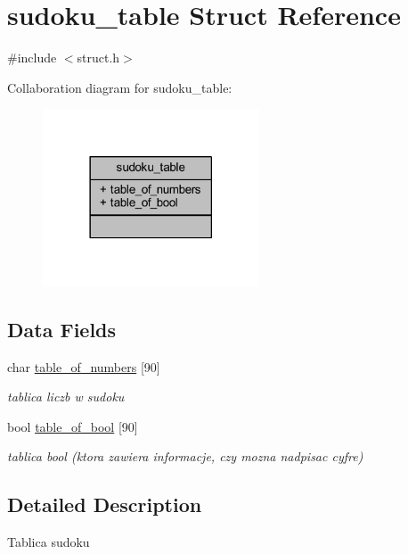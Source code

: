 \hypertarget{structsudoku__table}{}\section{sudoku\+\_\+table Struct Reference}
\label{structsudoku__table}


{\ttfamily \#include $<$struct.\+h$>$}



Collaboration diagram for sudoku\+\_\+table\+:
\nopagebreak
\begin{figure}[H]
\begin{center}
\leavevmode
\includegraphics[width=182pt]{structsudoku__table__coll__graph}
\end{center}
\end{figure}
\subsection*{Data Fields}
\begin{DoxyCompactItemize}
\item 
char \mbox{\hyperlink{structsudoku__table_a661729e27124049e643cbcb860278e5e}{table\+\_\+of\+\_\+numbers}} \mbox{[}90\mbox{]}
\begin{DoxyCompactList}\small\item\em tablica liczb w sudoku \end{DoxyCompactList}\item 
bool \mbox{\hyperlink{structsudoku__table_a6130b17f77753d54f4a0acdc07fb1e0a}{table\+\_\+of\+\_\+bool}} \mbox{[}90\mbox{]}
\begin{DoxyCompactList}\small\item\em tablica bool (ktora zawiera informacje, czy mozna nadpisac cyfre) \end{DoxyCompactList}\end{DoxyCompactItemize}


\subsection{Detailed Description}
Tablica sudoku 

